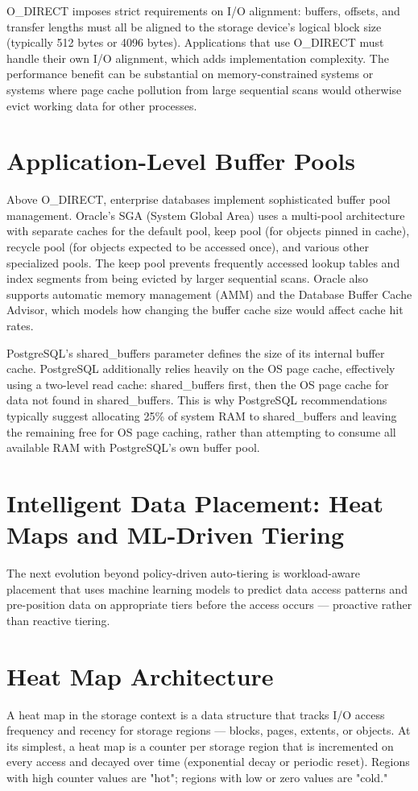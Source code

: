 O\_DIRECT imposes strict requirements on I/O alignment: buffers, offsets, and transfer lengths must all be aligned to the storage device's logical block size (typically 512 bytes or 4096 bytes). Applications that use O\_DIRECT must handle their own I/O alignment, which adds implementation complexity. The performance benefit can be substantial on memory-constrained systems or systems where page cache pollution from large sequential scans would otherwise evict working data for other processes.

\section{Application-Level Buffer Pools}
Above O\_DIRECT, enterprise databases implement sophisticated buffer pool management. Oracle's SGA (System Global Area) uses a multi-pool architecture with separate caches for the default pool, keep pool (for objects pinned in cache), recycle pool (for objects expected to be accessed once), and various other specialized pools. The keep pool prevents frequently accessed lookup tables and index segments from being evicted by larger sequential scans. Oracle also supports automatic memory management (AMM) and the Database Buffer Cache Advisor, which models how changing the buffer cache size would affect cache hit rates.

PostgreSQL's shared\_buffers parameter defines the size of its internal buffer cache. PostgreSQL additionally relies heavily on the OS page cache, effectively using a two-level read cache: shared\_buffers first, then the OS page cache for data not found in shared\_buffers. This is why PostgreSQL recommendations typically suggest allocating 25\% of system RAM to shared\_buffers and leaving the remaining free for OS page caching, rather than attempting to consume all available RAM with PostgreSQL's own buffer pool.

\section{Intelligent Data Placement: Heat Maps and ML-Driven Tiering}
The next evolution beyond policy-driven auto-tiering is workload-aware placement that uses machine learning models to predict data access patterns and pre-position data on appropriate tiers before the access occurs --- proactive rather than reactive tiering.

\section{Heat Map Architecture}
A heat map in the storage context is a data structure that tracks I/O access frequency and recency for storage regions --- blocks, pages, extents, or objects. At its simplest, a heat map is a counter per storage region that is incremented on every access and decayed over time (exponential decay or periodic reset). Regions with high counter values are "hot"; regions with low or zero values are "cold."

